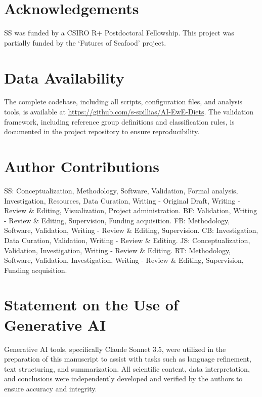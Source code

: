 \documentclass[12pt,a4paper]{article}
\begin{document}







\section*{Acknowledgements}
SS was funded by a CSIRO R+ Postdoctoral Fellowship. This project was partially funded by the `Futures of Seafood' project.

\section*{Data Availability}
The complete codebase, including all scripts, configuration files, and analysis tools, is available at \url{https://github.com/s-spillias/AI-EwE-Diets}. The validation framework, including reference group definitions and classification rules, is documented in the project repository to ensure reproducibility.

\section*{Author Contributions}
SS: Conceptualization, Methodology, Software, Validation, Formal analysis, Investigation, Resources, Data Curation, Writing - Original Draft, Writing - Review \& Editing, Visualization, Project administration. BF: Validation, Writing - Review \& Editing, Supervision, Funding acquisition. FB: Methodology, Software, Validation, Writing - Review \& Editing, Supervision. CB: Investigation, Data Curation, Validation, Writing - Review \& Editing. JS: Conceptualization, Validation, Investigation, Writing - Review \& Editing. RT: Methodology, Software, Validation, Investigation, Writing - Review \& Editing, Supervision, Funding acquisition.

\section*{Statement on the Use of Generative AI}
Generative AI tools, specifically Claude Sonnet 3.5, were utilized in the preparation of this manuscript to assist with tasks such as language refinement, text structuring, and summarization. All scientific content, data interpretation, and conclusions were independently developed and verified by the authors to ensure accuracy and integrity.




\clearpage

\end{document}
